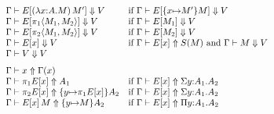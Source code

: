 \documentclass{article}
\theoremstyle{break}
\begin{document}
\newcommand{\weakconequiv}[4]{#1\vdash #2 \sim #3 : #4}
\newcommand{\conequiv}[4]{#1\vdash #2 \Join #3 : #4}
\newcommand{\aconequiv}[4]{#1\vdash #2 \iff #3 : #4}
\newcommand{\akindequiv}[3]{#1\vdash #2 \iff #3}
\newcommand{\headnormsto}[4]{#1\vdash #2 \Downarrow #4}
\newcommand{\reconstruct}[3]{#1\vdash #2 \Uparrow #3}
\newcommand{\isvalue}[3]{#1\vdash #2\mbox{\ value } #3}
\newcommand{\cvalue}{V}
\[
\!\!\!\!\!\!\!\begin{array}{lp{4.2truein}}
\headnormsto{\context}
   {E[\capply{(\cfunction{\cvar}{\kind}{\constructor})}
             {\constructor'}]}
   {\ktype}
   {\cvalue}&
   if 
   $\headnormsto{\context}
     {E[\substitute{\cvar}{\constructor'}{\constructor}]}{\ktype}{\cvalue}$\\

\headnormsto{\context}
   {E[\cpi{1}{\cpair{\constructor_1}{\constructor_2}}]}
   {\ktype}
   {\cvalue}&
   if
   $\headnormsto{\context}{E[\constructor_1]}{\ktype}{\cvalue}$\\
\headnormsto{\context}
   {E[\cpi{2}{\cpair{\constructor_1}{\constructor_2}}]}
   {\ktype}
   {\cvalue}&
   if
   $\headnormsto{\context}{E[\constructor_2]}{\ktype}{\cvalue}$\\
\headnormsto{\context}{E[\cvar]}{\ktype}{\cvalue}&
   if
   $\reconstruct{\context}{E[\cvar]}{\ksingleton{\constructor}}$ and
   $\headnormsto{\context}{\constructor}{\ktype}{\cvalue}$\\
\headnormsto{\context}{\cvalue}{\ktype}{\cvalue}\\[7pt]

\reconstruct{\context}{\cvar}{\context(\cvar)}\\
\reconstruct{\context}{\cpi{1}{E[\cvar]}}{\kind_1}&
  if
  $\reconstruct{\context}{E[\cvar]}{\ksigma{\othercvar}{\kind_1}{\kind_2}}$\\
\reconstruct{\context}{\cpi{2}{E[\cvar]}}
  {\substitute{\othercvar}{\cpi{1}{E[\cvar]}}\kind_2}&
  if
  $\reconstruct{\context}{E[\cvar]}{\ksigma{\othercvar}{\kind_1}{\kind_2}}$\\
\reconstruct{\context}{\capply{E[\cvar]}{\constructor}}
  {\substitute{\othercvar}{\constructor}{\kind_2}}&
  if
  $\reconstruct{\context}{E[\cvar]}{\kpi{\othercvar}{\kind_1}{\kind_2}}$\\[7pt]


\end{array}\]
\end{document}
